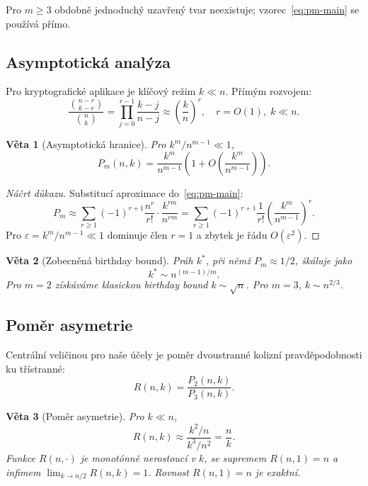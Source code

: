 \documentclass[11pt,a4paper]{article}
\newtheorem{theorem}{V\v{e}ta}
\begin{document}
Pro $m \geq 3$ obdobně jednoduchý uzavřený tvar neexistuje; vzorec~\eqref{eq:pm-main} se používá přímo.

\subsection{Asymptotická analýza}

Pro kryptografické aplikace je klíčový režim $k \ll n$. Přímým rozvojem:
\[
\frac{\binom{n-r}{k-r}}{\binom{n}{k}} = \prod_{j=0}^{r-1} \frac{k - j}{n - j} \approx \left(\frac{k}{n}\right)^r, \quad r = O(1), \; k \ll n.
\]

\begin{theorem}[Asymptotická hranice]\label{thm:asymptotic}
Pro $k^m / n^{m-1} \ll 1$,
\begin{equation}\label{eq:asymptotic}
P_m(n, k) = \frac{k^m}{n^{m-1}} \left(1 + O\!\left(\frac{k^m}{n^{m-1}}\right)\right).
\end{equation}
\end{theorem}

\begin{proof}[Náčrt důkazu]
Substitucí aproximace do~\eqref{eq:pm-main}:
\[
P_m \approx \sum_{r \geq 1} (-1)^{r+1} \frac{n^r}{r!} \cdot \frac{k^{rm}}{n^{rm}} = \sum_{r \geq 1} (-1)^{r+1} \frac{1}{r!} \left(\frac{k^m}{n^{m-1}}\right)^r.
\]
Pro $\varepsilon = k^m/n^{m-1} \ll 1$ dominuje člen $r = 1$ a zbytek je řádu $O(\varepsilon^2)$.
\end{proof}

\begin{theorem}[Zobecněná birthday bound]\label{thm:birthday-bound}
Práh $k^*$, při němž $P_m \approx 1/2$, škáluje jako
\[
k^* \sim n^{(m-1)/m}.
\]
Pro $m = 2$ získáváme klasickou birthday bound $k \sim \sqrt{n}$. Pro $m = 3$, $k \sim n^{2/3}$.
\end{theorem}

\subsection{Poměr asymetrie}\label{sec:asymmetry-ratio}

Centrální veličinou pro naše účely je poměr dvoustranné kolizní pravděpodobnosti ku třístranné:
\[
R(n, k) = \frac{P_2(n, k)}{P_3(n, k)}.
\]

\begin{theorem}[Poměr asymetrie]\label{thm:asymmetry}
Pro $k \ll n$,
\begin{equation}\label{eq:asymmetry}
R(n, k) \approx \frac{k^2 / n}{k^3 / n^2} = \frac{n}{k}.
\end{equation}
Funkce $R(n, \cdot)$ je monotónně nerostoucí v $k$, se supremem $R(n, 1) = n$ a infimem $\lim_{k \to n/2} R(n, k) = 1$. Rovnost $R(n, 1) = n$ je exaktní.
\end{theorem}
\end{document}
